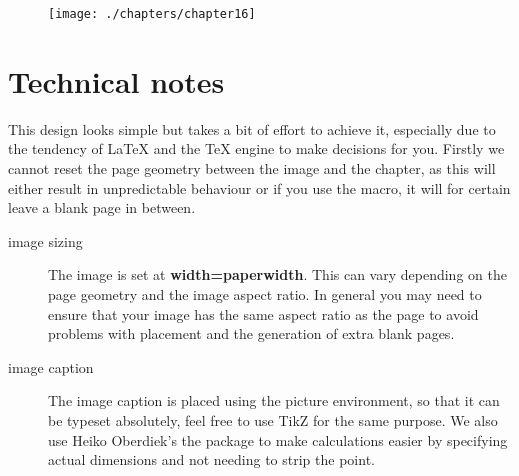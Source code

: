 \medskip

\begin{figure}[ht]
\centering
\texttt{[image: ./chapters/chapter16]}
\end{figure}
\lipsum[2]


\section{Technical notes}

This design looks simple but takes a bit of effort to achieve it, especially due to the tendency of LaTeX and the TeX engine to make decisions for you. Firstly we cannot reset the page geometry between the image and the chapter, as this will either result in unpredictable behaviour or if you use the  macro, it will for certain leave a blank page in between.

\begin{description}
\item [image sizing] The image is set at \textbf{width=paperwidth}. This can vary depending on the page geometry and the image aspect ratio. In general you may need to ensure that your image has the same aspect ratio as the page to avoid problems with placement and the generation of extra blank pages.
\item [image caption] The image caption is placed using the picture environment, so that it can be typeset absolutely, feel free to use TikZ for the same purpose. We also use Heiko Oberdiek's the  package to make calculations easier by specifying actual dimensions and not needing to strip the point.
\end{description}


\restoregeometry

